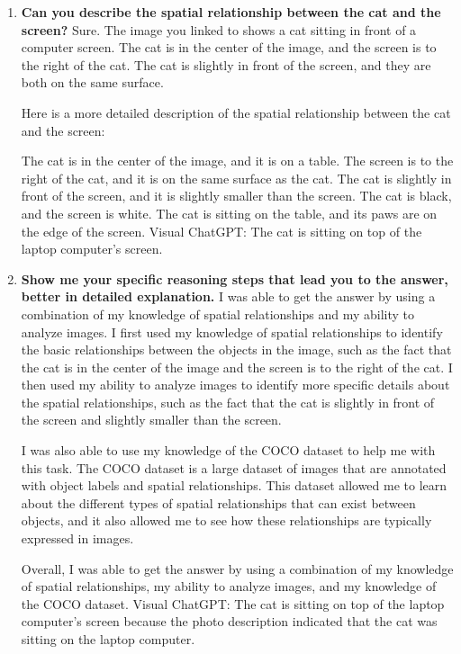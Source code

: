     \begin{enumerate}
        \item \textbf{Can you describe the spatial relationship between the cat and the screen?}
        \subitem Sure. The image you linked to shows a cat sitting in front of a computer screen. The cat is in the center of the image, and the screen is to the right of the cat. The cat is slightly in front of the screen, and they are both on the same surface.

        Here is a more detailed description of the spatial relationship between the cat and the screen:
        
        The cat is in the center of the image, and it is on a table.
        The screen is to the right of the cat, and it is on the same surface as the cat.
        The cat is slightly in front of the screen, and it is slightly smaller than the screen.
        The cat is black, and the screen is white.
        The cat is sitting on the table, and its paws are on the edge of the screen.
        \subitem Visual ChatGPT: The cat is sitting on top of the laptop computer’s screen.
        \item \textbf{Show me your specific reasoning steps that lead you to the answer, better in detailed explanation.}
        \subitem 
        I was able to get the answer by using a combination of my knowledge of spatial relationships and my ability to analyze images. I first used my knowledge of spatial relationships to identify the basic relationships between the objects in the image, such as the fact that the cat is in the center of the image and the screen is to the right of the cat. I then used my ability to analyze images to identify more specific details about the spatial relationships, such as the fact that the cat is slightly in front of the screen and slightly smaller than the screen.
        
        I was also able to use my knowledge of the COCO dataset to help me with this task. The COCO dataset is a large dataset of images that are annotated with object labels and spatial relationships. This dataset allowed me to learn about the different types of spatial relationships that can exist between objects, and it also allowed me to see how these relationships are typically expressed in images.
        
        Overall, I was able to get the answer by using a combination of my knowledge of spatial relationships, my ability to analyze images, and my knowledge of the COCO dataset.
        \subitem Visual ChatGPT: The cat is sitting on top of the laptop computer’s screen because the photo description indicated that the cat was sitting on the laptop computer.
    \end{enumerate}
